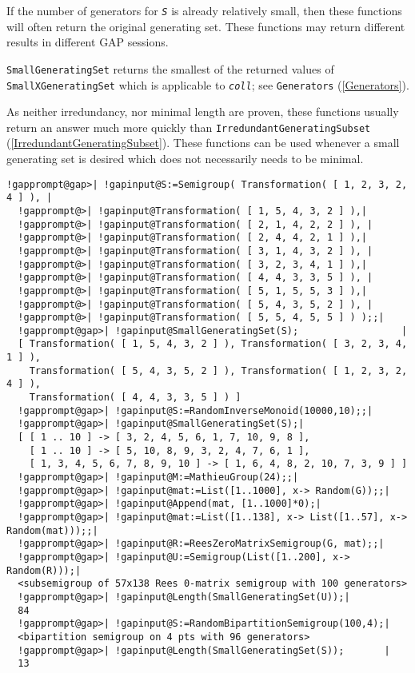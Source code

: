 \documentclass[a4paper,11pt]{report}
\begin{document}
{{{ If the number of generators for \mbox{\texttt{\mdseries\slshape S}} is already relatively small, then these functions will often return the
original generating set. These functions may return different results in
different \textsf{GAP} sessions.

 \texttt{SmallGeneratingSet} returns the smallest of the returned values of \texttt{SmallXGeneratingSet} which is applicable to \mbox{\texttt{\mdseries\slshape coll}}; see \texttt{Generators} (\ref{Generators}).

 As neither irredundancy, nor minimal length are proven, these functions
usually return an answer much more quickly than \texttt{IrredundantGeneratingSubset} (\ref{IrredundantGeneratingSubset}). These functions can be used whenever a small generating set is desired which
does not necessarily needs to be minimal. 
\begin{Verbatim}[commandchars=!@|,fontsize=\small,frame=single,label=Example]
  !gapprompt@gap>| !gapinput@S:=Semigroup( Transformation( [ 1, 2, 3, 2, 4 ] ), |
  !gapprompt@>| !gapinput@Transformation( [ 1, 5, 4, 3, 2 ] ),|
  !gapprompt@>| !gapinput@Transformation( [ 2, 1, 4, 2, 2 ] ), |
  !gapprompt@>| !gapinput@Transformation( [ 2, 4, 4, 2, 1 ] ),|
  !gapprompt@>| !gapinput@Transformation( [ 3, 1, 4, 3, 2 ] ), |
  !gapprompt@>| !gapinput@Transformation( [ 3, 2, 3, 4, 1 ] ),|
  !gapprompt@>| !gapinput@Transformation( [ 4, 4, 3, 3, 5 ] ), |
  !gapprompt@>| !gapinput@Transformation( [ 5, 1, 5, 5, 3 ] ),|
  !gapprompt@>| !gapinput@Transformation( [ 5, 4, 3, 5, 2 ] ), |
  !gapprompt@>| !gapinput@Transformation( [ 5, 5, 4, 5, 5 ] ) );;|
  !gapprompt@gap>| !gapinput@SmallGeneratingSet(S);                  |
  [ Transformation( [ 1, 5, 4, 3, 2 ] ), Transformation( [ 3, 2, 3, 4, 1 ] ), 
    Transformation( [ 5, 4, 3, 5, 2 ] ), Transformation( [ 1, 2, 3, 2, 4 ] ), 
    Transformation( [ 4, 4, 3, 3, 5 ] ) ]
  !gapprompt@gap>| !gapinput@S:=RandomInverseMonoid(10000,10);;|
  !gapprompt@gap>| !gapinput@SmallGeneratingSet(S);|
  [ [ 1 .. 10 ] -> [ 3, 2, 4, 5, 6, 1, 7, 10, 9, 8 ], 
    [ 1 .. 10 ] -> [ 5, 10, 8, 9, 3, 2, 4, 7, 6, 1 ], 
    [ 1, 3, 4, 5, 6, 7, 8, 9, 10 ] -> [ 1, 6, 4, 8, 2, 10, 7, 3, 9 ] ]
  !gapprompt@gap>| !gapinput@M:=MathieuGroup(24);;|
  !gapprompt@gap>| !gapinput@mat:=List([1..1000], x-> Random(G));;|
  !gapprompt@gap>| !gapinput@Append(mat, [1..1000]*0);|
  !gapprompt@gap>| !gapinput@mat:=List([1..138], x-> List([1..57], x-> Random(mat)));;|
  !gapprompt@gap>| !gapinput@R:=ReesZeroMatrixSemigroup(G, mat);;|
  !gapprompt@gap>| !gapinput@U:=Semigroup(List([1..200], x-> Random(R)));|
  <subsemigroup of 57x138 Rees 0-matrix semigroup with 100 generators>
  !gapprompt@gap>| !gapinput@Length(SmallGeneratingSet(U));|
  84
  !gapprompt@gap>| !gapinput@S:=RandomBipartitionSemigroup(100,4);|
  <bipartition semigroup on 4 pts with 96 generators>
  !gapprompt@gap>| !gapinput@Length(SmallGeneratingSet(S));       |
  13
\end{Verbatim}
 }

}}
\end{document}
